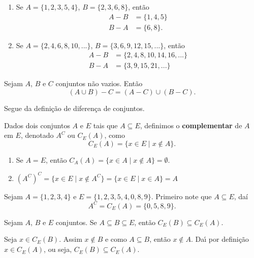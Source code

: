 \begin{exemplos}
	\begin{enumerate}[label={\arabic*})]
		\item Se $A=\{1,2,3,5,4\}$, $B=\{2,3,6,8\}$, então
		\begin{align*}
			A - B &= \{1,4,5\}\\
			B - A &=\{6,8\}.
		\end{align*}
		\item Se $A=\{2,4,6,8,10,...\}$, $B=\{3,6,9,12,15,...\}$, então
		\begin{align*}
		 	A - B &= \{2,4,8,10,14,16,...\}\\
		 	B - A &= \{3,9,15,21,...\}
		 \end{align*}
	\end{enumerate}
	
\end{exemplos}

\begin{proposicao}
	Sejam $A$, $B$ e $C$ conjuntos n\~ao vazios. Ent\~ao
	\[(A \cup B) - C = (A - C) \cup (B - C).\]
\end{proposicao}
\begin{prova}
	Segue da defini\c{c}\~ao de diferen\c{c}a de conjuntos.
\end{prova}

\begin{definicao}[Complementar]
Dados dois conjuntos $A$ e $E$ tais que $A\subseteq E$, definimos o \textbf{complementar} de $A$ em $E$, denotado $A^C$ ou $C_E(A)$, como
\[
	C_E(A) = \{ x \in E \mid x \notin A \}.
\]
\end{definicao}

\begin{observacoes}
	\begin{enumerate}
		\item Se $A = E$, ent{\~a}o $C_A(A) = \{ x \in A \mid x \notin A \} = \emptyset$.
		\item $(A^C)^C = \{x \in E \mid x \notin A^C\} = \{ x \in E \mid x \in A \} = A$
	\end{enumerate}
	
\end{observacoes}

\begin{exemplo}
	Sejam $A = \{1,2,3,4\}$ e $E = \{1,2,3,5,4,0,8,9\}$. Primeiro note que $A \subseteq E$, daí
	\[
			A^C = C_E(A) = \{0,5,8,9\}.
	\]
\end{exemplo}

\begin{proposicao}
	Sejam $A$, $B$ e $E$ conjuntos. Se $A\subseteq B\subseteq E$, ent{\~a}o $C_E(B)\subseteq C_E(A)$.
\end{proposicao}
\begin{prova}
	Seja $x \in C_E(B)$. Assim $x\notin B$ e como $A \subseteq B$, ent\~ao $x \notin A$. Da{\'\i} por defini\c{c}\~ao $x\in C_E(A)$, ou seja, $C_E(B) \subseteq C_E(A)$.
\end{prova}

